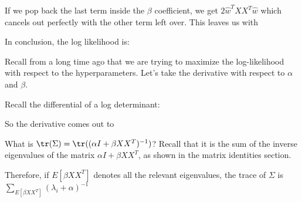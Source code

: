 \documentclass[12pt]{article}
\begin{document}

If we pop back the last term inside the $\beta$ coefficient, we get $2\hat w^T XX^T \hat w$ which cancels out perfectly with the other term left over. This leaves us with


In conclusion, the log likelihood is:


Recall from a long time ago that we are trying to maximize the log-likelihood with respect to the hyperparameters. Let's take the derivative with respect to $\alpha$ and $\beta$.


Recall the differential of a log determinant:


So the derivative comes out to 

What is $\tr(\Sigma) = \tr((\alpha I + \beta XX^T)^{-1})$? Recall that it is the sum of the inverse eigenvalues of the matrix $\alpha I + \beta XX^T$, as shown in the matrix identities section. 


Therefore, if $E[\beta XX^T]$ denotes all the relevant eigenvalues, the trace of $\Sigma$ is $\sum_{E[\beta XX^T]} (\lambda_i + \alpha)^{-1}$
\end{document}
